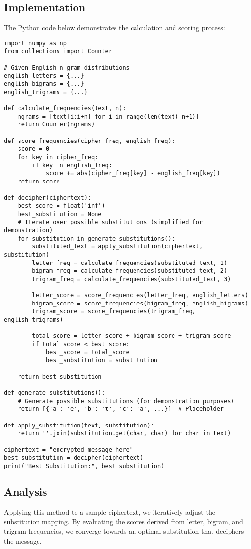 \documentclass[12pt]{article}
\begin{document}
\subsection{Implementation}
The Python code below demonstrates the calculation and scoring process:

\begin{lstlisting}
import numpy as np
from collections import Counter

# Given English n-gram distributions
english_letters = {...}
english_bigrams = {...}
english_trigrams = {...}

def calculate_frequencies(text, n):
	ngrams = [text[i:i+n] for i in range(len(text)-n+1)]
	return Counter(ngrams)

def score_frequencies(cipher_freq, english_freq):
	score = 0
	for key in cipher_freq:
		if key in english_freq:
			score += abs(cipher_freq[key] - english_freq[key])
	return score

def decipher(ciphertext):
	best_score = float('inf')
	best_substitution = None
	# Iterate over possible substitutions (simplified for demonstration)
	for substitution in generate_substitutions():
		substituted_text = apply_substitution(ciphertext, substitution)
		letter_freq = calculate_frequencies(substituted_text, 1)
		bigram_freq = calculate_frequencies(substituted_text, 2)
		trigram_freq = calculate_frequencies(substituted_text, 3)
		
		letter_score = score_frequencies(letter_freq, english_letters)
		bigram_score = score_frequencies(bigram_freq, english_bigrams)
		trigram_score = score_frequencies(trigram_freq, english_trigrams)
		
		total_score = letter_score + bigram_score + trigram_score
		if total_score < best_score:
			best_score = total_score
			best_substitution = substitution

	return best_substitution

def generate_substitutions():
	# Generate possible substitutions (for demonstration purposes)
	return [{'a': 'e', 'b': 't', 'c': 'a', ...}]  # Placeholder

def apply_substitution(text, substitution):
	return ''.join(substitution.get(char, char) for char in text)

ciphertext = "encrypted message here"
best_substitution = decipher(ciphertext)
print("Best Substitution:", best_substitution)
\end{lstlisting}

\subsection{Analysis}
Applying this method to a sample ciphertext, we iteratively adjust the substitution mapping. By evaluating the scores derived from letter, bigram, and trigram frequencies, we converge towards an optimal substitution that deciphers the message.
\end{document}
